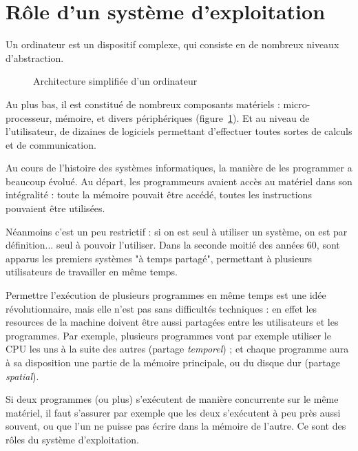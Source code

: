 \section{Rôle d'un système d'exploitation}

Un ordinateur est un dispositif complexe, qui consiste en de nombreux niveaux
d'abstraction.


\cite{tanenbaum}


\begin{figure}
\centering

\caption{Architecture simplifiée d'un ordinateur}
\label{fig:archi-simplifiee}
\end{figure}

Au plus bas, il est constitué de nombreux composants matériels :
micro-processeur, mémoire, et divers périphériques
(figure~\ref{fig:archi-simplifiee}). Et au niveau de l'utilisateur, de dizaines
de logiciels permettant d'effectuer toutes sortes de calculs et de
communication.

Au cours de l'histoire des systèmes informatiques, la manière de les programmer
a beaucoup évolué. Au départ, les programmeurs avaient accès au matériel dans
son intégralité : toute la mémoire pouvait être accédé, toutes les instructions
pouvaient être utilisées.

Néanmoins c'est un peu restrictif : si on est seul à utiliser un système, on est
par définition... seul à pouvoir l'utiliser. Dans la seconde moitié des années
60, sont apparus les premiers systèmes "à temps partagé", permettant à plusieurs
utilisateurs de travailler en même temps.

Permettre l'exécution de plusieurs programmes en même temps est une idée
révolutionnaire, mais elle n'est pas sans difficultés techniques : en effet les
resources de la machine doivent être aussi partagées entre les utilisateurs et
les programmes. Par exemple, plusieurs programmes vont par exemple utiliser le
CPU les uns à la suite des autres (partage \emph{temporel}) ; et chaque
programme aura à sa disposition une partie de la mémoire principale, ou du
disque dur (partage \emph{spatial}).

Si deux programmes (ou plus) s'exécutent de manière concurrente sur le même
matériel, il faut s'assurer par exemple que les deux s'exécutent à peu près
aussi souvent, ou que l'un ne puisse pas écrire dans la mémoire de l'autre. Ce
sont des rôles du système d'exploitation.


